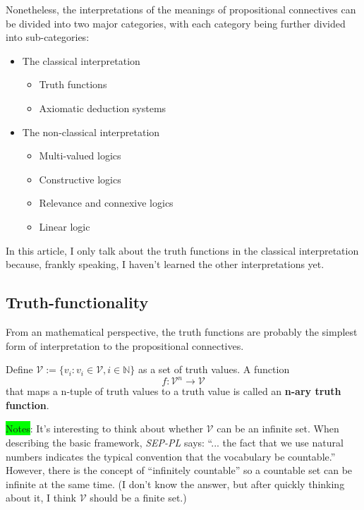 \documentclass[12pt, letterpaper]{article}
\begin{document}
Nonetheless, the interpretations of the meanings of propositional connectives
can be divided into two major categories, with each category being further
divided into sub-categories:
\begin{itemize}
  \item The classical interpretation
    \begin{itemize}
      \item Truth functions
      \item Axiomatic deduction systems
    \end{itemize}
  \item The non-classical interpretation
    \begin{itemize}
      \item Multi-valued logics
      \item Constructive logics
      \item Relevance and connexive logics
      \item Linear logic
    \end{itemize}
\end{itemize}

In this article, I only talk about the truth functions in the classical
interpretation because, frankly speaking, I haven't learned the other
interpretations yet.

\subsection{Truth-functionality}

From an mathematical perspective, the truth functions are probably the simplest
form of interpretation to the propositional connectives.

Define $\mathcal{V} := \{v_i: v_i \in \mathcal{V}, i \in \mathbb{N}\}$ as a set
of truth values. A function \[f: \mathcal{V}^n \rightarrow \mathcal{V}\] that
maps a n-tuple of truth values to a truth value is called an \textbf{n-ary
truth function}.

\colorbox{lime}{Notes}: It's interesting to think about whether $\mathcal{V}$
can be an infinite set. When describing the basic framework, \textit{SEP-PL}
says: ``... the fact that we use natural numbers indicates the typical
convention that the vocabulary be countable.'' However, there is the concept of
``infinitely countable'' so a countable set can be infinite at the same time.
(I don't know the answer, but after quickly thinking about it, I think
$\mathcal{V}$ should be a finite set.)
\end{document}
